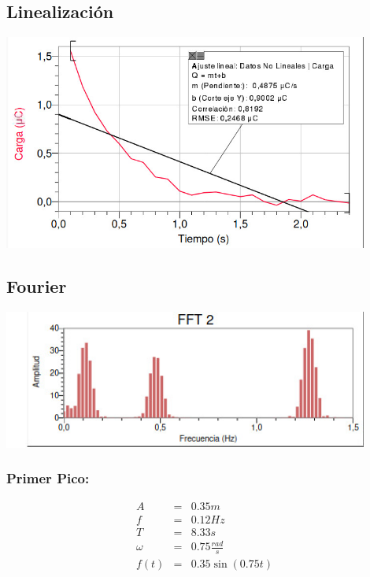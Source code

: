 \documentclass[12pt]{exam}
\newenvironment{Figura}
  {\par\medskip\noindent\minipage{\linewidth}}
  {\endminipage\par\medskip}
\begin{document}
\begin{multicols}{2}
  \subsection{Linealización}
  \begin{Figura}
    \centering
    \includegraphics[width=0.9\textwidth]{Imagen_2.jpeg}
    \label{fig}
\end{Figura}
  \subsection{Fourier}
\begin{Figura}
    \centering
    \includegraphics[width=0.9\textwidth]{Imagen_3.jpeg}
    \label{fig}
\end{Figura}
  \subsubsection{Primer Pico:}
  \begin{eqnarray*}
    A & = & 0.35 m\\
    f & = & 0.12 Hz\\
    T & = & 8.33 s\\
    \omega & = & 0.75 \frac{rad}{s}\\
    f(t) & = & 0.35\sin(0.75t)
  \end{eqnarray*}

\end{multicols}
\end{document}
